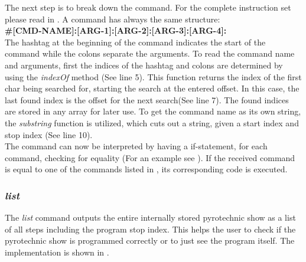 \noindent The next step is to break down the command. For the complete instruction set please read in . A command has always the same structure:\\

\noindent \textbf{\#[CMD-NAME]:[ARG-1]:[ARG-2]:[ARG-3]:[ARG-4]:}\\

\noindent The hashtag at the beginning of the command indicates the start of the command while the colons separate  the arguments. To read the command name and arguments, first the indices of the hashtag and colons are determined by using the \textit{indexOf} method (See  line 5). This function returns the index of the first char being searched for, starting the search at the entered offset. In this case, the last found index is the offset for the next search(See  line 7). The found indices are stored in any array for later use. To get the command name as its own string, the \textit{substring} function is utilized, which cuts out a string, given a start index and stop index (See line 10).  \\



\noindent The command can now be interpreted by having a if-statement, for each command, checking for equality (For an example see ). If the received command is equal to one of the commands listed in , its corresponding code is executed.\\

\pagebreak

\subsubsection{\textit{list}}
The \textit{list} command outputs the entire internally stored pyrotechnic show as a list of all steps including the program stop index. This helps the user to check if the pyrotechnic show is programmed correctly or to just see the program itself. The implementation is shown in .  
 




